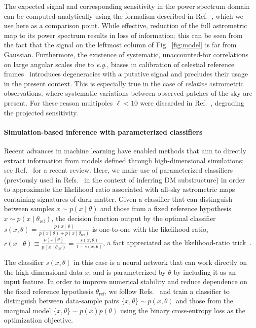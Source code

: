 \documentclass[]{article}
\begin{document}

The expected signal and corresponding sensitivity in the power spectrum domain can be computed analytically using the formalism described in Ref.~\cite{Mishra-Sharma:2020ynk}, which we use here as a comparison point. While effective, reduction of the full astrometric map to its power spectrum results in loss of information; this can be seen from the fact that the signal on the leftmost column of Fig.~\ref{fig:model} is far from Gaussian. Furthermore, the existence of systematic, unaccounted-for correlations on large angular scales due to \emph{e.g.}, biases in calibration of celestial reference frames~\cite{2018A&A...616A..14G} introduces degeneracies with a putative signal and precludes their usage in the present context. This is especially true in the case of \emph{relative} astrometric observations, where systematic variations between observed patches of the sky are present. For these reason multipoles $\ell < 10$ were discarded in Ref.~\cite{Mishra-Sharma:2020ynk}, degrading the projected sensitivity.

\paragraph{Simulation-based inference with parameterized classifiers} Recent advances in machine learning have enabled methods that aim to directly extract information from models defined through high-dimensional simulations; see Ref.~\cite{Cranmer:2019eaq} for a recent review. Here, we make use of parameterized classifiers~\cite{Cranmer:2015bka,Baldi:2016fzo,Brehmer:2018eca,Brehmer:2018hga,Brehmer:2018kdj,Hermans:2019ioj} (previously used in Refs.~\cite{Brehmer:2019jyt,Hermans:2020skz} in the context of inferring DM substructure) in order to approximate the likelihood ratio associated with all-sky astrometric maps containing signatures of dark matter. Given a classifier that can distinguish between samples $x \sim p(x\mid\theta)$ and those from a fixed reference hypothesis $x \sim p(x\mid\theta_\mathrm{ref})$, the decision function output by the optimal classifier $s(x, \theta) = \frac{p(x\mid\theta)}{p(x\mid\theta) + p(x\mid\theta_\mathrm{ref})}$ is one-to-one with the likelihood ratio, $r(x\mid \theta) \equiv \frac{p(x\mid\theta)}{p(x\mid\theta_\mathrm{ref})}  = \frac{s(x, \theta)}{1 - s(x, \theta)}$, a fact appreciated as the likelihood-ratio trick~\cite{Cranmer:2015bka}. 

The classifier $s(x, \theta)$ in this case is a neural network that can work directly on the high-dimensional data $x$, and is parameterized by $\theta$ by including it as an input feature. In order to improve numerical stability and reduce dependence on the fixed reference hypothesis $\theta_\mathrm{ref}$, we follow Refs.~\cite{Brehmer:2019jyt,Hermans:2019ioj} and train a classifier to distinguish between data-sample pairs $\{x, \theta\} \sim p(x,\theta)$ and those from the marginal model $\{x, \theta\} \sim p(x)p(\theta)$ using the binary cross-entropy loss as the optimization objective. 
\end{document}
